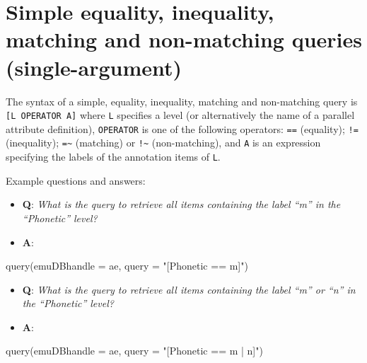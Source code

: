 \documentclass[
]{book}
\newenvironment{Shaded}{\begin{snugshade}}{\end{snugshade}}
\newcommand{\AttributeTok}[1]{\textcolor[rgb]{0.77,0.63,0.00}{#1}}
\newcommand{\FunctionTok}[1]{\textcolor[rgb]{0.00,0.00,0.00}{#1}}
\newcommand{\NormalTok}[1]{#1}
\newcommand{\StringTok}[1]{\textcolor[rgb]{0.31,0.60,0.02}{#1}}
\providecommand{\tightlist}{%
  \setlength{\itemsep}{0pt}\setlength{\parskip}{0pt}}
\begin{document}
\hypertarget{simple-equality-inequality-matching-non-matching-queries-single-argument}{%
\section{Simple equality, inequality, matching and non-matching queries (single-argument)}\label{simple-equality-inequality-matching-non-matching-queries-single-argument}}

The syntax of a simple, equality, inequality, matching and non-matching query is \texttt{{[}L\ OPERATOR\ A{]}} where \texttt{L} specifies a level (or alternatively the name of a parallel attribute definition), \texttt{OPERATOR} is one of the following operators: \texttt{==} (equality); \texttt{!=} (inequality); \texttt{=\textasciitilde{}} (matching) or \texttt{!\textasciitilde{}} (non-matching), and \texttt{A} is an expression specifying the labels of the annotation items of \texttt{L}.

Example questions and answers:

\begin{itemize}
\tightlist
\item
  \textbf{Q}: \emph{What is the query to retrieve all items containing the label ``m'' in the ``Phonetic'' level?}
\item
  \textbf{A}:
\end{itemize}

\begin{Shaded}
\begin{Highlighting}[]
\FunctionTok{query}\NormalTok{(}\AttributeTok{emuDBhandle =}\NormalTok{ ae, }
      \AttributeTok{query =} \StringTok{"[Phonetic == m]"}\NormalTok{)}
\end{Highlighting}
\end{Shaded}

\begin{itemize}
\tightlist
\item
  \textbf{Q}: \emph{What is the query to retrieve all items containing the label ``m'' or ``n'' in the ``Phonetic'' level?}
\item
  \textbf{A}:
\end{itemize}

\begin{Shaded}
\begin{Highlighting}[]
\FunctionTok{query}\NormalTok{(}\AttributeTok{emuDBhandle =}\NormalTok{ ae, }
      \AttributeTok{query =} \StringTok{"[Phonetic == m | n]"}\NormalTok{)}
\end{Highlighting}
\end{Shaded}
\end{document}
